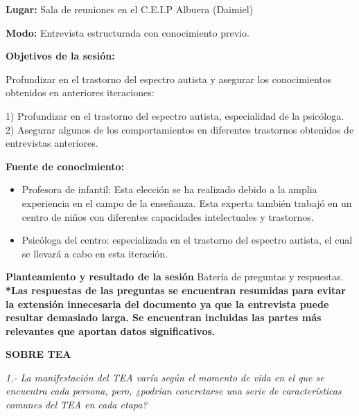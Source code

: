 \documentclass[letterpaper,12pt]{article}
\begin{document}
	\begin{flushleft}
	\textbf{Lugar:} Sala de reuniones en el C.E.I.P Albuera (Daimiel)
	\end{flushleft}
	\begin{flushleft}
	\textbf{Modo:} Entrevista estructurada con conocimiento previo.
	\end{flushleft}
	\begin{flushleft}
	\textbf{Objetivos de la sesión:}
	\end{flushleft}
	Profundizar en el trastorno del espectro autista y asegurar los conocimientos obtenidos en anteriores iteraciones: \\
	
	\begin{flushleft}
	1) Profundizar en el trastorno del espectro autista, especialidad de la psicóloga. \\
	2) Asegurar algunos de los comportamientos en diferentes trastornos obtenidos de entrevistas anteriores.
	\end{flushleft}
	
	\textbf{Fuente de conocimiento: }\\
	\begin{itemize}
	\item Profesora de infantil:	Esta elección se ha realizado debido a la amplia experiencia en el campo de la enseñanza. Esta experta también trabajó en un centro de niños con diferentes capacidades intelectuales y trastornos.
	\item Psicóloga del centro: especializada en el trastorno del espectro autista, el cual se llevará a cabo en esta iteración.
	\end{itemize}
	

\textbf{Planteamiento y resultado de la sesión}
Batería de preguntas y respuestas. \\
	
	\textbf{*Las respuestas de las preguntas se encuentran resumidas para
evitar la extensión innecesaria del documento ya que la entrevista puede resultar demasiado larga. Se encuentran incluidas las partes más relevantes que aportan datos
significativos.} \\

\begin{flushleft}
\textbf{SOBRE TEA}
\end{flushleft}
\textit{1.- La manifestación del TEA varía según el momento de vida en el que se encuentra cada persona, pero, ¿podrían concretarse una serie de características comunes del TEA en cada etapa?}\\
\end{document}
